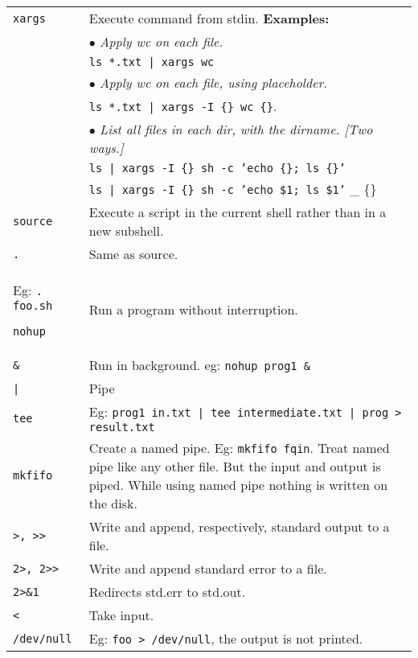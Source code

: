 \begin{tabularx}{\linewidth}{lX}

    \texttt{xargs}              & Execute command from stdin. \textbf{Examples:}\\
                                & $\bullet$ \textit{Apply wc on each file.}\\
                                & \quad \texttt{ls *.txt | xargs wc}\\
                                & $\bullet$ \textit{Apply wc on each file, using placeholder.}\\
                                & \quad \texttt{ls *.txt | xargs -I \{\} wc \{\}}.\\
                                & $\bullet$ \textit{List all files in each dir, with the dirname. [Two ways.]}\\
                                & \quad \texttt{ls | xargs -I \{\} sh -c 'echo \{\}; ls \{\}'}\\
                                & \quad \texttt{ls | xargs -I \{\} sh -c 'echo \$1; ls \$1'} \_ \{\}\\
    \hline

    \texttt{source}          &  Execute a script in the current shell rather than in a new subshell.\\
    \texttt{.}               &  Same as source.\\
                                Eg: \texttt{. foo.sh}

    \texttt{nohup}              & Run a program without interruption.\\
    \texttt{\&}                 & Run in background. eg: \texttt{nohup prog1 \&}\\
    \hline

    \texttt{|}                  & Pipe \\
    \texttt{tee}                & Eg: \texttt{prog1 in.txt | tee intermediate.txt | prog > result.txt}\\
    \texttt{mkfifo}             & Create a named pipe. Eg: \texttt{mkfifo fqin}. Treat named pipe like any other file. But the input and output is piped. While using named pipe nothing is written on the disk.\\
    \hline

    \texttt{>, >>}              & Write and append, respectively, standard output to a file. \\
    \texttt{2>, 2>>}            & Write and append standard error to a file. \\
    \texttt{2>\&1}              & Redirects std.err to std.out.\\
    \texttt{<}                  & Take input.\\
    \texttt{/dev/null}          & Eg: \texttt{foo > /dev/null}, the output is not printed.\\

\end{tabularx}



